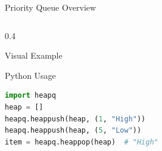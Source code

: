\documentclass[aspectratio=169,xcolor=dvipsnames]{beamer}
\begin{document}
\begin{frame}[fragile]{Priority Queue Overview}
\begin{columns}
\begin{column}{0.4\textwidth}
\begin{exampleblock}{Visual Example}
      \end{exampleblock}

      \vspace{0.3cm}

      \begin{exampleblock}{Python Usage}
        \begin{lstlisting}[language=Python,basicstyle=\tiny\ttfamily]
import heapq
heap = []
heapq.heappush(heap, (1, "High"))
heapq.heappush(heap, (5, "Low"))
item = heapq.heappop(heap)  # "High"
        \end{lstlisting}
      \end{exampleblock}
    \end{column}
  \end{columns}
\end{frame}
\end{document}
